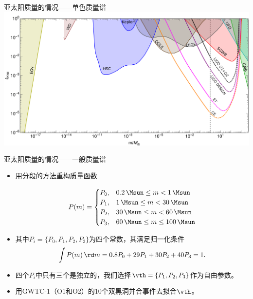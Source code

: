 \documentclass[xcolor={svgnames},compress]{beamer}
\let\olditem\item
\renewcommand{\item}{%
    \olditem\vspace{\fill}}
\def\e{\begin{equation}}
\def\q{\end{equation}}
\begin{document}
\begin{frame}{亚太阳质量的情况——单色质量谱}
    \centering
    \includegraphics[width=\textwidth]{fpbh_m.pdf}
\end{frame}


\begin{frame}{亚太阳质量的情况——一般质量谱}
    \begin{itemize}
        \item 用分段的方法重构质量函数
        
        \e\label{para} 
        P(m) = \begin{cases} 
            P_0, & 0.2\, \Msun \leq m < 1\, \Msun \\
            P_1, & 1\, \Msun \leq m < 30\, \Msun \\
            P_2, & 30\, \Msun \leq m < 60\, \Msun \\
            P_3, & 60\, \Msun \leq m \leq 100\, \Msun
        \end{cases}
        \q 
        
        \item 其中$P_i = \{ P_0, P_1, P_2, P_3 \} $为四个常数，其满足归一化条件
        \e 
        \int P(m)\, \rd m = 0.8P_0 + 29P_1 + 30P_2 + 40P_3 = 1.
        \q 
        
        \item 四个$P_i$中只有三个是独立的，我们选择$\vth = \{P_1, P_2, P_3\}$作为自由参数。
        
        \item 用GWTC-1（O1和O2）的10个双黑洞并合事件去拟合$\vth$。
    \end{itemize}    
\end{frame}
\end{document}
